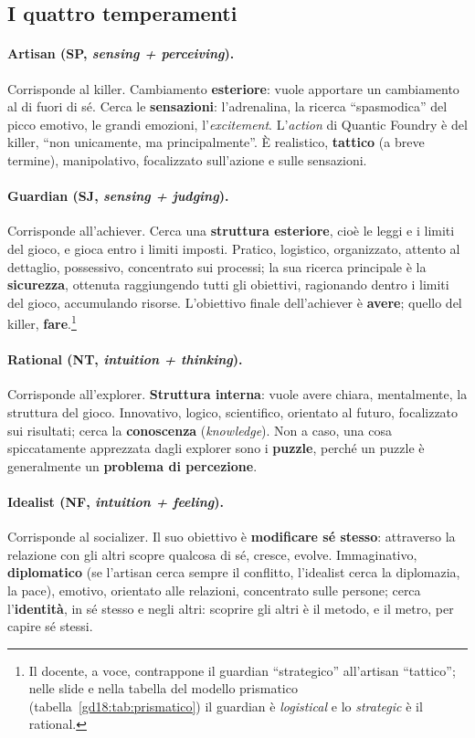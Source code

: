 \subsection{I quattro temperamenti}

\paragraph{Artisan (SP, \emph{sensing + perceiving}).} Corrisponde al killer.
Cambiamento \textbf{esteriore}: vuole apportare un cambiamento al di fuori di sé.
Cerca le \textbf{sensazioni}: l'adrenalina, la ricerca ``spasmodica'' del picco
emotivo, le grandi emozioni, l'\emph{excitement}. L'\emph{action} di Quantic Foundry
è del killer, ``non unicamente, ma principalmente''. È realistico, \textbf{tattico}
(a breve termine), manipolativo, focalizzato sull'azione e sulle sensazioni.

\paragraph{Guardian (SJ, \emph{sensing + judging}).} Corrisponde all'achiever.
Cerca una \textbf{struttura esteriore}, cioè le leggi e i limiti del gioco, e gioca
entro i limiti imposti. Pratico, logistico, organizzato, attento al dettaglio,
possessivo, concentrato sui processi; la sua ricerca principale è la
\textbf{sicurezza}, ottenuta raggiungendo tutti gli obiettivi, ragionando dentro i
limiti del gioco, accumulando risorse. L'obiettivo finale dell'achiever è
\textbf{avere}; quello del killer, \textbf{fare}.\footnote{Il docente, a voce,
contrappone il guardian ``strategico'' all'artisan ``tattico''; nelle slide e nella
tabella del modello prismatico (tabella~\ref{gd18:tab:prismatico}) il guardian è
\emph{logistical} e lo \emph{strategic} è il rational.}

\paragraph{Rational (NT, \emph{intuition + thinking}).} Corrisponde all'explorer.
\textbf{Struttura interna}: vuole avere chiara, mentalmente, la struttura del gioco.
Innovativo, logico, scientifico, orientato al futuro, focalizzato sui risultati;
cerca la \textbf{conoscenza} (\emph{knowledge}). Non a caso, una cosa spiccatamente
apprezzata dagli explorer sono i \textbf{puzzle}, perché un puzzle è generalmente un
\textbf{problema di percezione}.

\paragraph{Idealist (NF, \emph{intuition + feeling}).} Corrisponde al socializer. Il
suo obiettivo è \textbf{modificare sé stesso}: attraverso la relazione con gli
altri scopre qualcosa di sé, cresce, evolve. Immaginativo, \textbf{diplomatico} (se
l'artisan cerca sempre il conflitto, l'idealist cerca la diplomazia, la pace),
emotivo, orientato alle relazioni, concentrato sulle persone; cerca
l'\textbf{identità}, in sé stesso e negli altri: scoprire gli altri è il metodo, e il
metro, per capire sé stessi.

